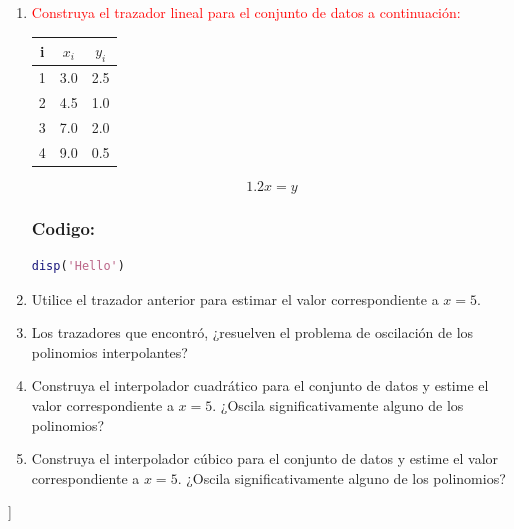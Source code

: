 \begin{enumerate}
    \item \textcolor{red}{Construya el trazador lineal para el conjunto de datos a continuación:}
        \begin{center}
            \begin{tabular}{ c c c }
                i & $x_i$ & $y_i$ \\
                \hline
                1 & 3.0 & 2.5 \\
                2 & 4.5 & 1.0 \\
                3 & 7.0 & 2.0 \\
                4 & 9.0 & 0.5 \\
            \end{tabular}
        \end{center}

        \[1.\text{2}x = y\]
    
        \subsubsection*{Codigo:}
        \begin{lstlisting}[language=Matlab, caption=Python Code]
disp('Hello')
        \end{lstlisting}
    
    \item Utilice el trazador anterior para estimar el valor correspondiente a \( x = 5 \).
    
    \item Los trazadores que encontró, ¿resuelven el problema de oscilación de los polinomios interpolantes?
    
    \item Construya el interpolador cuadrático para el conjunto de datos y estime el valor correspondiente a \( x = 5 \). ¿Oscila significativamente alguno de los polinomios?

    \item Construya el interpolador cúbico para el conjunto de datos y estime el valor correspondiente a \( x = 5 \). ¿Oscila significativamente alguno de los polinomios?
\end{enumerate}]




